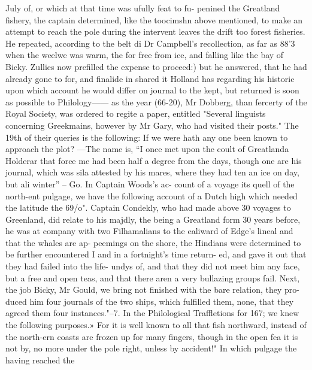 July of, or which at that time was ufully feat to fu- penined the Greatland fishery, the captain determined, like the toocimshn above mentioned, to make an attempt to reach the pole during the intervent leaves the drift too forest fisheries. He repeated, according to the belt di Dr Campbell's recollection, as far as 88'3 when the weelwe was warm, the for free from ice, and falling like the bay of Bicky. Zullies now prefilled the expense to proceed:) but he answered, that he had already gone to for, and finalide in shared it Holland has regarding his historic upon which account he would differ on journal to the kept, but returned is soon as possible to Philology—— as the year (66-20), Mr Dobberg, than fercerty of the Royal Society, was ordered to regite a paper, entitled "Several linguists concerning Greekmains, however by Mr Gary, who had visited their posts." The 19th of their queries is the following: If we were hath any one been known to approach the plot? —The name is, “I once met upon the coult of Greatlanda Holderar that force me had been half a degree from the days, though one are his journal, which was sila attested by his mares, where they had ten an ice on day, but ali winter” – Go. In Captain Woods’s ac- count of a voyage its quell of the north-ent pulgage, we have the following account of a Dutch high which needed the latitude the 69/o". Captain Condekly, who had made above 30 voyages to Greenland, did relate to his majdly, the being a Greatland form 30 years before, he was at company with two Filhamalians to the ealiward of Edge’s lineal and that the whales are ap- peemings on the shore, the Hindians were determined to be further encountered I and in a fortnight’s time return- ed, and gave it out that they had failed into the life- undys of, and that they did not meet him any face, but a free and open teas, and that there aren a very bullazing groups fail. Next, the job Bicky, Mr Gould, we bring not finished with the bare relation, they pro-duced him four journals of the two ships, which fulfilled them, none, that they agreed them four instances."--7. In the Philological Traffletions for 167; we knew the following purposes.» For it is well known to all that fish northward, instead of the north-ern coasts are frozen up for many fingers, though in the open fea it is not by, no more under the pole right, unless by accident!" In which pulgage the having reached the\par\medskip
